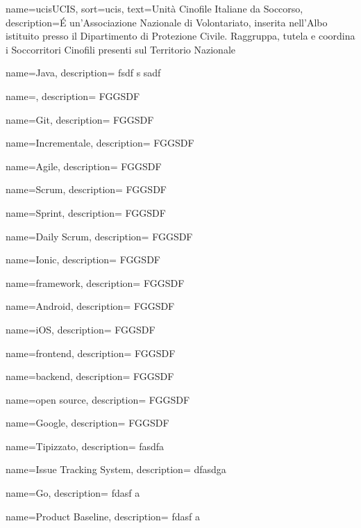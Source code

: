 {
    name=\gls{ucis}{UCIS},
    sort=ucis,
    text=Unità Cinofile Italiane da Soccorso,
    description={É un'Associazione Nazionale di Volontariato, inserita nell'Albo istituito presso il Dipartimento di Protezione Civile. Raggruppa, tutela e coordina i Soccorritori Cinofili presenti sul Territorio Nazionale}
}

{
  name=Java,
  description={ fsdf s sadf }
}

{
  name=,
  description={ FGGSDF }
}

{
  name=Git,
  description={ FGGSDF }
}

{
  name=Incrementale,
  description={ FGGSDF }
}

{
  name=Agile,
  description={ FGGSDF }
}

{
  name=Scrum,
  description={ FGGSDF }
}

{
  name=Sprint,
  description={ FGGSDF }
}

{
  name=Daily Scrum,
  description={ FGGSDF }
}

{
  name=Ionic,
  description={ FGGSDF }
}

{
  name=framework,
  description={ FGGSDF }
}

{
  name=Android,
  description={ FGGSDF }
}

{
  name=iOS,
  description={ FGGSDF }
}

{
  name=frontend,
  description={ FGGSDF }
}

{
  name=backend,
  description={ FGGSDF }
}

{
  name=open source,
  description={ FGGSDF }
}

{
  name=Google,
  description={ FGGSDF }
}

{
  name=Tipizzato,
  description= { fasdfa }
}

{
  name=Issue Tracking System,
  description={ dfasdga }
}

{
  name=Go,
  description={ fdasf a}
}


{
  name=Product Baseline,
  description={ fdasf a}
}

